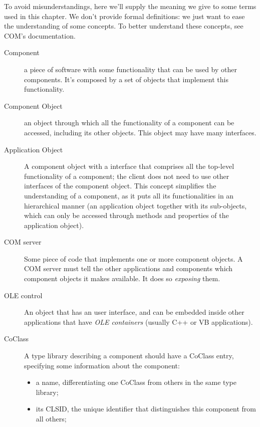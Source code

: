 \documentclass[11pt,a4paper,english]{report}
\begin{document}
To avoid misunderstandings, here we'll supply the meaning we give to
some terms used in this chapter. We don't provide formal definitions:
we just want to ease the understanding of some concepts. To better
understand these concepts, see COM's documentation.

\begin{description}

\item [Component] a piece of software with some functionality that can
be used by other components. It's composed by a set of objects that
implement this functionality.

\item [Component Object] an object through which all the functionality
of a component can be accessed, including its other objects. This
object may have many interfaces.

\item [Application Object] A component object with a interface that
comprises all the top-level functionality of a component; the client
does not need to use other interfaces of the component object. This
concept simplifies the understanding of a component, as it puts all
its functionalities in an hierarchical manner (an application object
together with its sub-objects, which can only be accessed through
methods and properties of the application object).

\item [COM server] Some piece of code that implements one or more
component objects. A COM server must tell the other applications and
components which component objects it makes available. It does so
\emph{exposing} them.

\item[OLE control] An object that has an user interface, and can be
embedded inside other applications that have \emph{OLE containers}
(usually C++ or VB applications).

\item [CoClass] A type library describing a component should have a
CoClass entry, specifying some information about the component:

  \begin{itemize}

  \item a name, differentiating one CoClass from others in the same
  type library;

  \item its CLSID, the unique identifier that distinguishes this
  component from all others;


\end{itemize}
\end{description}
\end{document}
